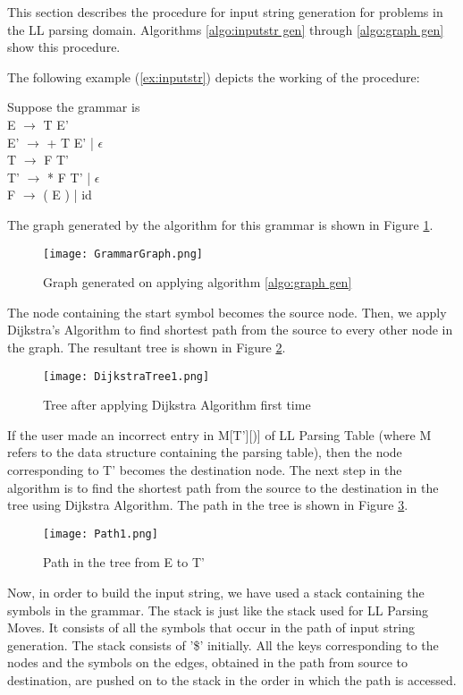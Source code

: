 This section describes the procedure for input string generation for problems in the LL parsing domain. Algorithms \ref{algo:inputstr gen} through \ref{algo:graph gen} show this procedure.

The following example (\ref{ex:inputstr}) depicts the working of the procedure:
\begin{example}
\label{ex:inputstr}
Suppose the grammar is \\
E $\to$ T E' \\
E' $\to$ + T E' | $\epsilon$ \\
T $\to$ F T' \\
T' $\to$ * F T' | $\epsilon$ \\
F $\to$ ( E ) | id

The graph generated by the algorithm for this grammar is shown in Figure \ref{fig:Grammar Graph}.
\begin{figure}
\centering
\texttt{[image: GrammarGraph.png]}
\caption{Graph generated on applying algorithm \ref{algo:graph gen}}
\label{fig:Grammar Graph}
\end{figure}

The node containing the start symbol becomes the source node. Then, we apply Dijkstra's Algorithm to find shortest path from the source to every other node in the graph. The resultant tree is shown in Figure \ref{fig:Dijkstra Tree 1}.
\begin{figure}
\centering
\texttt{[image: DijkstraTree1.png]}
\caption{Tree after applying Dijkstra Algorithm first time}
\label{fig:Dijkstra Tree 1}
\end{figure}

If the user made an incorrect entry in M[T'][)] of LL Parsing Table (where M refers to the data structure containing the parsing table), then the node corresponding to T' becomes the destination node. The next step in the algorithm is to find the shortest path from the source to the destination in the tree using Dijkstra Algorithm. The path in the tree is shown in Figure \ref{fig:Path 1}.

\begin{figure}
\centering
\texttt{[image: Path1.png]}
\caption{Path in the tree from E to T'}
\label{fig:Path 1}
\end{figure}

Now, in order to build the input string, we have used a stack containing the symbols in the grammar. The stack is just like the stack used for LL Parsing Moves. It consists of all the symbols that occur in the path of input string generation. The stack consists of '\$' initially. All the keys corresponding to the nodes and the symbols on the edges, obtained in the path from source to destination, are pushed on to the stack in the order in which the path is accessed.


\end{example}
